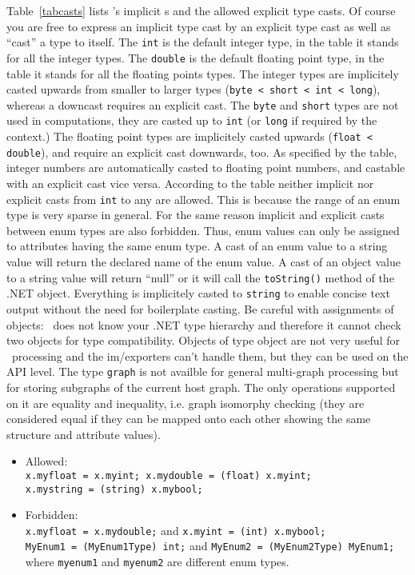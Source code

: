 Table~\ref{tabcasts} lists \GrG's implicit s and the allowed explicit type casts.
Of course you are free to express an implicit type cast by an explicit type cast as well as ``cast'' a type to itself.
The \texttt{int} is the default integer type, in the table it stands for all the integer types.
The \texttt{double} is the default floating point type, in the table it stands for all the floating points types.
The integer types are implicitely casted upwards from smaller to larger types (\texttt{byte < short < int < long}), whereas a downcast requires an explicit cast.
The \texttt{byte} and \texttt{short} types are not used in computations, they are casted up to \texttt{int} (or \texttt{long} if required by the context.)
The floating point types are implicitely casted upwards (\texttt{float < double}), and require an explicit cast downwards, too.
As specified by the table, integer numbers are automatically casted to floating point numbers, and castable with an explicit cast vice versa.
According to the table neither implicit nor explicit casts from {\tt int} to any  are allowed.
This is because the range of an enum type is very sparse in general.
For the same reason implicit and explicit casts between enum types are also forbidden.
Thus, enum values can only be assigned to attributes having the same enum type.
A cast of an enum value to a string value will return the declared name of the enum value.
A cast of an object value to a string value will return ``null'' or it will call the \texttt{toString()} method of the .NET object.
Everything is implicitely casted to \texttt{string} to enable concise text output without the need for boilerplate casting.
Be careful with assignments of objects: \GrG\ does not know your .NET type hierarchy and therefore it cannot check two objects for type compatibility.
Objects of type object are not very useful for \GrG\ processing and the im/exporters can't handle them,
but they can be used on the API level.
The type \texttt{graph} is not availble for general multi-graph processing but for storing subgraphs of the current host graph.
The only operations supported on it are equality and inequality, i.e. graph isomorphy checking 
(they are considered equal if they can be mapped onto each other showing the same structure and attribute values).

\begin{example}
  \begin{itemize}
    \item Allowed:\\
	  \texttt{x.myfloat = x.myint; x.mydouble = (float) x.myint;\\ x.mystring = (string) x.mybool;}
    \item Forbidden:\\
      \texttt{x.myfloat = x.mydouble;} and \texttt{x.myint = (int) x.mybool;}\\
      \texttt{MyEnum1 = (MyEnum1Type) int;} and \texttt{MyEnum2 = (MyEnum2Type) MyEnum1;}
  where {\tt myenum1} and {\tt myenum2} are different enum types.

  \end{itemize}
\end{example}

